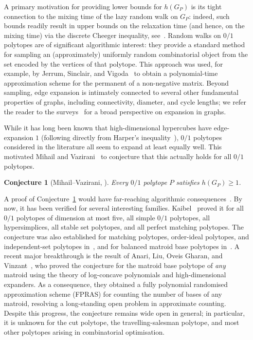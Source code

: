 \documentclass{article}
\newtheorem{conjecture}[thm]{Conjecture}
\theoremstyle{definition}
\begin{document}
A primary motivation for providing lower bounds for $h(G_P)$ is its tight connection to the mixing time of the lazy random walk on $G_P$: 
indeed, such bounds readily result in upper bounds on the relaxation time (and hence, on the mixing time) via the discrete Cheeger inequality, see~\cite[Sections 12-13]{LP17}.
Random walks on $0/1$ polytopes are of significant algorithmic interest: they provide a standard method for
sampling an (approximately) uniformly random combinatorial object from the set encoded by the
vertices of that polytope. This approach was used, for example, by Jerrum, Sinclair, and Vigoda~\cite{JSV} to obtain a polynomial-time approximation
scheme for the permanent of a non-negative matrix. Beyond sampling, edge
expansion is intimately connected to several other fundamental properties of
graphs, including connectivity, diameter, and cycle lengths; we refer the reader
to the surveys~\cite{HLW, Krivelevich} for a broad perspective on expansion in
graphs.

While it has long been known that high-dimensional hypercubes have edge-expansion $1$ (following directly from Harper's inequality~\cite{Harper}), $0/1$ polytopes considered in the literature all seem to expand at least equally well.
This motivated Mihail and Vazirani~\cite{Mihail92} to
conjecture that this actually holds for all $0/1$ polytopes.
 
\begin{conjecture}[Mihail--Vazirani, \cite{Mihail92}]\label{conj:MV}
  Every $0/1$ polytope $P$ satisfies $h(G_P) \ge 1$.
\end{conjecture}
 
A proof of Conjecture~\ref{conj:MV} would have far-reaching algorithmic
consequences~\cite{MV92,Gillmann,Kaibel04}.
By now, it has been verified for several interesting families.
Kaibel~\cite{Kaibel04} proved it for all $0/1$ polytopes of dimension at most
five, all simple $0/1$ polytopes, all hypersimplices, all stable set polytopes,
and all perfect matching polytopes.  The conjecture was also established for
matching polytopes, order-ideal polytopes, and independent-set polytopes
in~\cite{Mihailthesis}, and for balanced matroid base polytopes
in~\cite{FM92}.  A recent major breakthrough is the result of Anari, Liu, Oveis
Gharan, and Vinzant~\cite{ALOV}, who proved the conjecture for the matroid base
polytope of \emph{any} matroid using the theory of log-concave polynomials and
high-dimensional expanders. As a consequence, they obtained a fully polynomial
randomised approximation scheme (FPRAS) for counting the number of bases of any
matroid, resolving a long-standing open problem in approximate counting. Despite this progress, the conjecture remains wide
open in general; in particular, it is unknown for the cut polytope, the
travelling-salesman polytope, and most other polytopes arising in combinatorial
optimisation.
 
\end{document}
